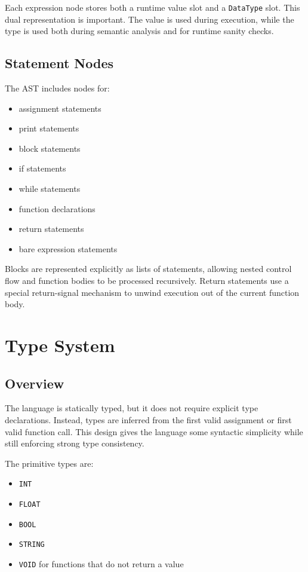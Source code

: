 \documentclass[12pt,a4paper]{article}
\begin{document}
Each expression node stores both a runtime value slot and a \texttt{DataType} slot. This dual representation is important. The value is used during execution, while the type is used both during semantic analysis and for runtime sanity checks.

\subsection{Statement Nodes}
The AST includes nodes for:

\begin{itemize}[leftmargin=1.0cm]
    \item assignment statements
    \item print statements
    \item block statements
    \item if statements
    \item while statements
    \item function declarations
    \item return statements
    \item bare expression statements
\end{itemize}

Blocks are represented explicitly as lists of statements, allowing nested control flow and function bodies to be processed recursively. Return statements use a special return-signal mechanism to unwind execution out of the current function body.

\section{Type System}
\subsection{Overview}
The language is statically typed, but it does not require explicit type declarations. Instead, types are inferred from the first valid assignment or first valid function call. This design gives the language some syntactic simplicity while still enforcing strong type consistency.

The primitive types are:
\begin{itemize}[leftmargin=1.0cm]
    \item \texttt{INT}
    \item \texttt{FLOAT}
    \item \texttt{BOOL}
    \item \texttt{STRING}
    \item \texttt{VOID} for functions that do not return a value
\end{itemize}
\end{document}
